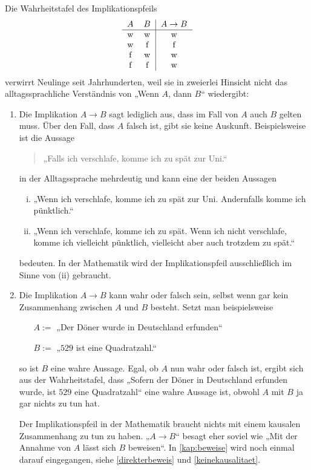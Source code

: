 \begin{bem}
    Die Wahrheitstafel des Implikationspfeils
    \[\begin{tabular}{cc|c}
        $A$ & $B$ &  $A\to B$  \\
        \hline
        w&w& w\\
        w&f& f\\
        f&w& w\\
        f&f& w\\
    \end{tabular}\]
    verwirrt Neulinge seit Jahrhunderten, weil sie in zweierlei Hinsicht nicht das alltagssprachliche Verständnis von „Wenn $A$, dann $B$“ wiedergibt:
    \begin{enumerate}[1.]
        \item Die Implikation $A\to B$ sagt lediglich aus, dass im Fall von $A$ auch $B$ gelten muss. Über den Fall, dass $A$ falsch ist, gibt sie keine Auskunft. Beispielsweise ist die Aussage
        \begin{quote}
            „Falls ich verschlafe, komme ich zu spät zur Uni.“
        \end{quote}
        in der Alltagssprache mehrdeutig und kann eine der beiden Aussagen
        \begin{enumerate}[(i)]
            \item „Wenn ich verschlafe, komme ich zu spät zur Uni. Andernfalls komme ich pünktlich.“
            \item „Wenn ich verschlafe, komme ich zu spät. Wenn ich nicht verschlafe, komme ich vielleicht pünktlich, vielleicht aber auch trotzdem zu spät.“
        \end{enumerate}
        bedeuten. In der Mathematik wird der Implikationspfeil ausschließlich im Sinne von (ii) gebraucht.
        \item Die Implikation $A\to B$ kann wahr oder falsch sein, selbst wenn gar kein Zusammenhang zwischen $A$ und $B$ besteht. Setzt man beispielsweise
        \begin{itemize}[labelindent=3em, leftmargin=!, labelwidth=]
            \item[$A:=$] „Der Döner wurde in Deutschland erfunden“
            \item[$B:=$] „$529$ ist eine Quadratzahl.“
        \end{itemize}
        so ist $B$ eine wahre Aussage. Egal, ob $A$ nun wahr oder falsch ist, ergibt sich aus der Wahrheitstafel, dass „Sofern der Döner in Deutschland erfunden wurde, ist $529$ eine Quadratzahl“ eine wahre Aussage ist, obwohl $A$ mit $B$ ja gar nichts zu tun hat.

        Der Implikationspfeil in der Mathematik braucht nichts mit einem kausalen Zusammenhang zu tun zu haben. „$A\to B$“ besagt eher soviel wie „Mit der Annahme von $A$ lässt sich $B$ beweisen“. In \cref{kap:beweise} wird noch einmal darauf eingegangen, siehe \cref{direkterbeweis} und \cref{keinekausalitaet}.
    \end{enumerate}
\end{bem}





